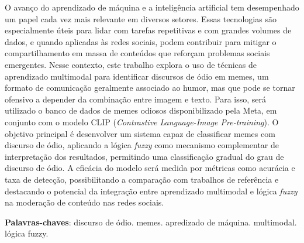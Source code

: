 \setlength{\absparsep}{18pt} %
\begin{resumo}

O avanço do aprendizado de máquina e a inteligência artificial tem desempenhado um papel cada vez mais relevante em diversos setores. Essas tecnologias são especialmente úteis para lidar com tarefas repetitivas e com grandes volumes de dados, e quando aplicadas às redes sociais, podem contribuir para mitigar o compartilhamento em massa de conteúdos que reforçam problemas sociais emergentes. Nesse contexto, este trabalho explora o uso de técnicas de aprendizado multimodal para identificar discursos de ódio em memes, um formato de comunicação geralmente associado ao humor, mas que pode se tornar ofensivo a depender da combinação entre imagem e texto. Para isso, será utilizado o banco de dados de memes odiosos disponibilizado pela Meta, em conjunto com o modelo CLIP (\textit{Contrastive Language-Image Pre-training}). O objetivo principal é desenvolver um sistema capaz de classificar memes com discurso de ódio, aplicando a lógica \textit{fuzzy} como mecanismo complementar de interpretação dos resultados, permitindo uma classificação gradual do grau de discurso de ódio. A eficácia do modelo será medida por métricas como acurácia e taxa de detecção, possibilitando a comparação com trabalhos de referência e destacando o potencial da integração entre aprendizado multimodal e lógica \textit{fuzzy} na moderação de conteúdo nas redes sociais.



 \textbf{Palavras-chaves}: discurso de ódio. memes. apredizado de máquina. multimodal. lógica fuzzy.
\end{resumo}



